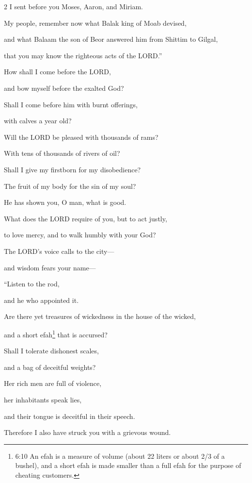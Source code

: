 \begin{multicols}{2}
I sent before you Moses, Aaron, and Miriam.

\myverse{}My people, remember now what Balak king of Moab devised,

and what Balaam the son of Beor answered him from Shittim to Gilgal,

that you may know the righteous acts of the LORD.”


\vspace{\baselineskip} \myverse{}How shall I come before the LORD,

and bow myself before the exalted God?

Shall I come before him with burnt offerings,

with calves a year old?

\myverse{}Will the LORD be pleased with thousands of rams?

With tens of thousands of rivers of oil?

Shall I give my firstborn for my disobedience?

The fruit of my body for the sin of my soul?

\myverse{}He has shown you, O man, what is good.

What does the LORD require of you, but to act justly,

to love mercy, and to walk humbly with your God?


\vspace{\baselineskip} \myverse{}The LORD’s voice calls to the city—

and wisdom fears your name—

“Listen to the rod,

and he who appointed it.

\myverse{}Are there yet treasures of wickedness in the house of the wicked,

and a short efah\footnote{6:10 An efah is a measure of volume (about 22 liters or about 2/3 of a bushel), and a short efah is
	made smaller than a full efah for the purpose of cheating customers.} that is accursed?

\myverse{}Shall I tolerate dishonest scales,

and a bag of deceitful weights?

\myverse{}Her rich men are full of violence,

her inhabitants speak lies,

and their tongue is deceitful in their speech.

\myverse{}Therefore I also have struck you with a grievous wound.


\end{multicols}
